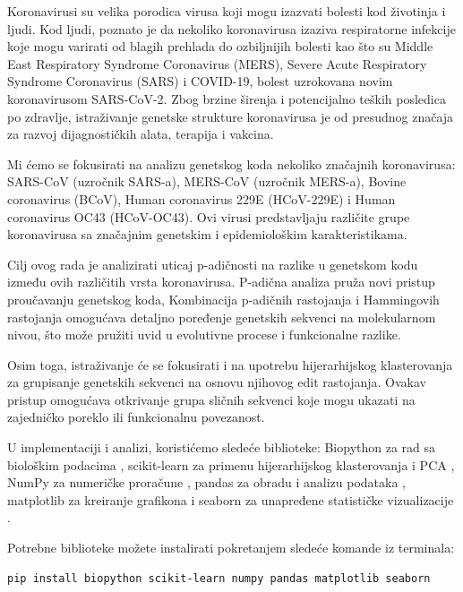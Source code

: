 \documentclass[a4paper,12pt]{article}
\begin{document}
\medskip
Koronavirusi su velika porodica virusa koji mogu izazvati bolesti kod životinja i ljudi. Kod ljudi, poznato je da nekoliko koronavirusa izaziva respiratorne infekcije koje mogu varirati od blagih prehlada do ozbiljnijih bolesti kao što su Middle East Respiratory Syndrome Coronavirus (MERS), Severe Acute Respiratory Syndrome Coronavirus (SARS) i COVID-19, bolest uzrokovana novim koronavirusom SARS-CoV-2. Zbog brzine širenja i potencijalno teških posledica po zdravlje, istraživanje genetske strukture koronavirusa je od presudnog značaja za razvoj dijagnostičkih alata, terapija i vakcina.

\bigskip
Mi ćemo se fokusirati na analizu genetskog koda nekoliko značajnih koronavirusa: SARS-CoV 
(uzročnik SARS-a), MERS-CoV (uzročnik MERS-a), Bovine coronavirus (BCoV), Human 
coronavirus 229E (HCoV-229E) i Human coronavirus OC43 (HCoV-OC43). Ovi virusi 
predstavljaju različite grupe koronavirusa sa značajnim genetskim i epidemiološkim 
karakteristikama.

\medskip
Cilj ovog rada je analizirati uticaj p-adičnosti na razlike u genetskom kodu između ovih različitih vrsta koronavirusa. P-adična analiza pruža novi pristup proučavanju genetskog koda, Kombinacija p-adičnih rastojanja i Hammingovih rastojanja omogućava detaljno poređenje genetskih sekvenci na 
molekularnom nivou, što može pružiti uvid u evolutivne procese i funkcionalne razlike.

\medskip
Osim toga, istraživanje će se fokusirati i na upotrebu hijerarhijskog klasterovanja za grupisanje 
genetskih sekvenci na osnovu njihovog edit rastojanja. Ovakav pristup omogućava otkrivanje grupa sličnih 
sekvenci koje mogu ukazati na zajedničko poreklo ili funkcionalnu povezanost.

\bigskip
U implementaciji i analizi, koristićemo sledeće biblioteke: Biopython za rad sa biološkim podacima \cite{cock2009biopython}, scikit-learn za primenu hijerarhijskog klasterovanja i PCA \cite{pedregosa2011scikit}, NumPy za numeričke proračune \cite{harris2020array}, pandas za obradu i analizu podataka \cite{mckinney2010data}, matplotlib za kreiranje grafikona \cite{hunter2007matplotlib} i seaborn za unapređene statističke vizualizacije \cite{waskom2020seaborn}.

Potrebne biblioteke možete instalirati pokretanjem sledeće komande iz terminala:
\small
\begin{verbatim}
pip install biopython scikit-learn numpy pandas matplotlib seaborn
\end{verbatim}
\normalsize
\end{document}

